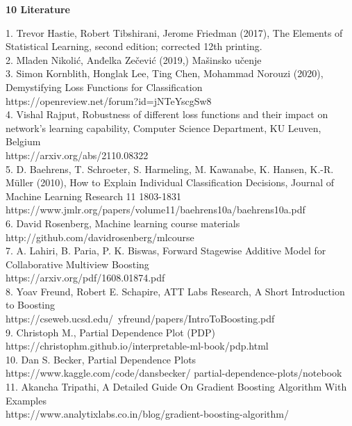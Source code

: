 \documentclass[12pt, letterpaper, twoside]{article}
\begin{document}
\begin{center}
\textbf{\large{10 Literature}}
\end{center}
1. Trevor Hastie, Robert Tibshirani, Jerome Friedman (2017), The Elements of Statistical Learning, second edition; corrected 12th printing.\\
2. Mladen Nikolić, Anđelka Zečević (2019,) Mašinsko učenje\\
3. Simon Kornblith, Honglak Lee, Ting Chen, Mohammad Norouzi (2020), Demystifying Loss Functions for Classification\\
https://openreview.net/forum?id=jNTeYscgSw8\\
4. Vishal Rajput, Robustness of different loss functions and their impact on network’s learning capability, Computer Science Department, KU Leuven, Belgium\\
https://arxiv.org/abs/2110.08322\\
5. D. Baehrens, T. Schroeter, S. Harmeling, M. Kawanabe, K. Hansen, K.-R. Müller (2010), How to Explain Individual Classification Decisions, Journal of Machine Learning Research 11 1803-1831\\
https://www.jmlr.org/papers/volume11/baehrens10a/baehrens10a.pdf\\
6. David Rosenberg, Machine learning course materials\\
http://github.com/davidrosenberg/mlcourse\\
7. A. Lahiri, B. Paria, P. K. Biswas, Forward Stagewise Additive Model for Collaborative Multiview Boosting\\
https://arxiv.org/pdf/1608.01874.pdf\\
8. Yoav Freund, Robert E. Schapire, ATT Labs Research, A Short Introduction to Boosting\\
https://cseweb.ucsd.edu/~yfreund/papers/IntroToBoosting.pdf\\
9. Christoph M., Partial Dependence Plot (PDP)\\
https://christophm.github.io/interpretable-ml-book/pdp.html\\
10. Dan S. Becker, Partial Dependence Plots\\
https://www.kaggle.com/code/dansbecker/
partial-dependence-plots/notebook\\
11. Akancha Tripathi, A Detailed Guide On Gradient Boosting Algorithm With Examples\\
https://www.analytixlabs.co.in/blog/gradient-boosting-algorithm/
\end{document}
